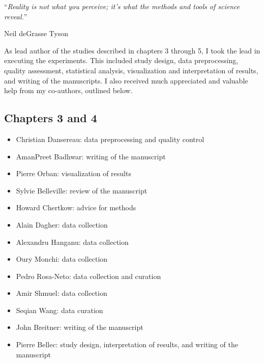 \documentclass[
12pt, %
oneside, %
english, %
onehalfspacing, %
liststotoc, %
toctotoc, %
headsepline, %
consistentlayout, %
]{MastersDoctoralThesis} %
\begin{document}
\vspace*{0.2\textheight}

\noindent\enquote{\itshape Reality is not what you perceive; it's what the methods and tools of science reveal.}\bigbreak

\hfill Neil deGrasse Tyson


\begin{contributions}
\addchaptertocentry{\contribs} %
As lead author of the studies described in chapters 3 through 5, I took the lead in executing the experiments. This included study design, data preprocessing, quality assessment, statistical analysis, visualization and interpretation of results, and writing of the manuscripts. I also received much appreciated and valuable help from my co-authors, outlined below.


\subsection*{Chapters 3 and 4}
\begin{itemize}
\setlength\itemsep{0em}
  \item Christian Dansereau: data preprocessing and quality control
  \item AmanPreet Badhwar: writing of the manuscript
  \item Pierre Orban: visualization of results
  \item Sylvie Belleville: review of the manuscript
  \item Howard Chertkow: advice for methods
  \item Alain Dagher: data collection
  \item Alexandru Hanganu: data collection
  \item Oury Monchi: data collection
  \item Pedro Rosa-Neto: data collection and curation
  \item Amir Shmuel: data collection
  \item Seqian Wang: data curation
  \item John Breitner: writing of the manuscript
  \item Pierre Bellec: study design, interpretation of results, and writing of the manuscript
\end{itemize}


\end{contributions}
\end{document}
